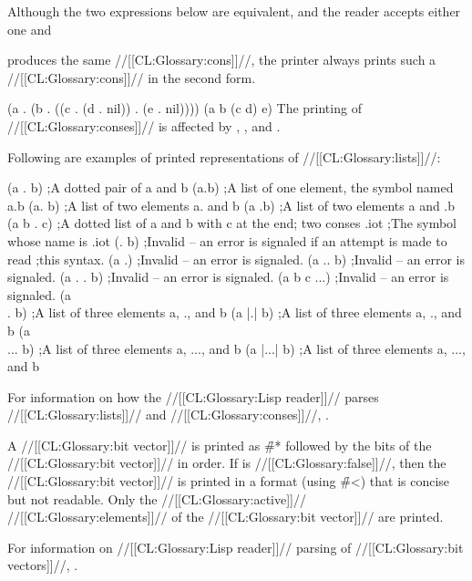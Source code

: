 Although the two expressions below are equivalent, and the reader accepts either one and 

produces the same //[[CL:Glossary:cons]]//, the printer always prints such a //[[CL:Glossary:cons]]// in the second form.

\code
 (a . (b . ((c . (d . nil)) . (e . nil))))
 (a b (c d) e) \endcode The printing of //[[CL:Glossary:conses]]// is affected by , , and .

\goodbreak          Following are examples of printed representations of //[[CL:Glossary:lists]]//:

\code
 (a . b)     ;A dotted pair of a and b
 (a.b)       ;A list of one element, the symbol named a.b
 (a. b)      ;A list of two elements a. and b
 (a .b)      ;A list of two elements a and .b
 (a b . c)   ;A dotted list of a and b with c at the end; two conses
 .iot        ;The symbol whose name is .iot
 (. b)       ;Invalid -- an error is signaled if an attempt is made to read 
             ;this syntax.
 (a .)       ;Invalid -- an error is signaled.
 (a .. b)    ;Invalid -- an error is signaled.
 (a . . b)   ;Invalid -- an error is signaled.
 (a b c ...) ;Invalid -- an error is signaled.
 (a \\. b)    ;A list of three elements a, ., and b
 (a |.| b)   ;A list of three elements a, ., and b
 (a \\... b)  ;A list of three elements a, ..., and b
 (a |...| b) ;A list of three elements a, ..., and b \endcode

For information on how the //[[CL:Glossary:Lisp reader]]// parses //[[CL:Glossary:lists]]// and //[[CL:Glossary:conses]]//, \seesection\LeftParen. 
      \endsubsubsection%

A //[[CL:Glossary:bit vector]]// is printed as \f{\#*} followed by the bits of the //[[CL:Glossary:bit vector]]// in order.  If  is //[[CL:Glossary:false]]//, then the //[[CL:Glossary:bit vector]]// is printed in a format (using \f{\#<}) that is concise but not readable. Only the //[[CL:Glossary:active]]// //[[CL:Glossary:elements]]// of the //[[CL:Glossary:bit vector]]// are printed.


For information on //[[CL:Glossary:Lisp reader]]// parsing of //[[CL:Glossary:bit vectors]]//, \seesection\SharpsignStar.

